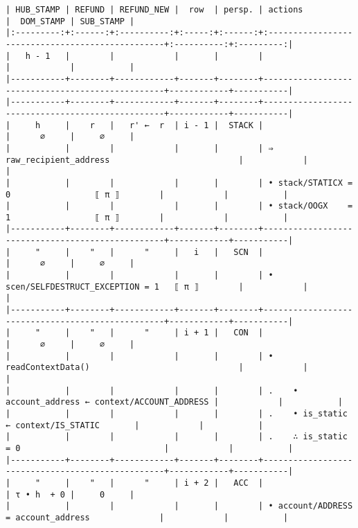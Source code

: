 \documentclass[varwidth=\maxdimen,margin=0.5cm,multi={verbatim}]{standalone}
\begin{document}
\begin{verbatim}
| HUB_STAMP | REFUND | REFUND_NEW |  row  | persp. | actions                                          |  DOM_STAMP | SUB_STAMP |
|:---------:+:------:+:----------:+:-----:+:------:+:-------------------------------------------------+:----------:+:---------:|
|   h - 1   |        |            |       |        |                                                  |            |           |
|-----------+--------+------------+-------+--------+--------------------------------------------------+------------+-----------|
|-----------+--------+------------+-------+--------+--------------------------------------------------+------------+-----------|
|     h     |    r   |   r' ←  r  | i - 1 |  STACK |                                                  |      ∅     |     ∅     |
|           |        |            |       |        | ⇒ raw_recipient_address                          |            |           |
|           |        |            |       |        | • stack/STATICX = 0                 ⟦ π ⟧        |            |           |
|           |        |            |       |        | • stack/OOGX    = 1                 ⟦ π ⟧        |            |           |
|-----------+--------+------------+-------+--------+--------------------------------------------------+------------+-----------|
|     "     |    "   |      "     |   i   |   SCN  |                                                  |      ∅     |     ∅     |
|           |        |            |       |        | • scen/SELFDESTRUCT_EXCEPTION = 1   ⟦ π ⟧        |            |           |
|-----------+--------+------------+-------+--------+--------------------------------------------------+------------+-----------|
|     "     |    "   |      "     | i + 1 |   CON  |                                                  |      ∅     |     ∅     |
|           |        |            |       |        | • readContextData()                              |            |           |
|           |        |            |       |        | .    • account_address ← context/ACCOUNT_ADDRESS |            |           |
|           |        |            |       |        | .    • is_static       ← context/IS_STATIC       |            |           |
|           |        |            |       |        | .    ∴ is_static = 0                             |            |           |
|-----------+--------+------------+-------+--------+--------------------------------------------------+------------+-----------|
|     "     |    "   |      "     | i + 2 |   ACC  |                                                  | τ • h  + 0 |     0     |
|           |        |            |       |        | • account/ADDRESS = account_address              |            |           |

\end{verbatim}
\end{document}
